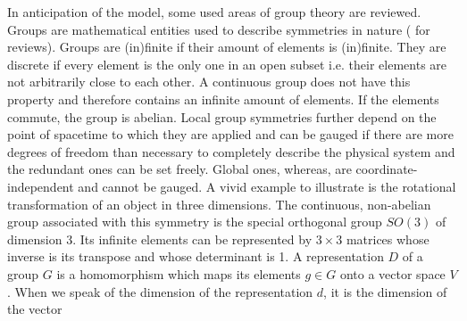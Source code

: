In anticipation of the model, some used areas of group theory are reviewed. Groups are mathematical entities used to describe symmetries in nature
(\cite{pierre}\cite{georgi} for reviews). Groups are (in)finite if their amount of elements is (in)finite. They are discrete if every element
is the only one in an open subset
i.e. their elements are not arbitrarily close to each other. A continuous group does not have this property and therefore
contains an infinite amount of elements. If the elements commute, the group is abelian. 
Local group symmetries further depend on the point of spacetime to which they are applied and can be gauged if there are more degrees of freedom
than necessary to completely describe the physical system and the redundant ones can be set freely. Global ones,
whereas, are coordinate-independent and cannot be gauged. 
A vivid example to illustrate is the rotational transformation
of an object in three dimensions. The continuous, non-abelian group associated with this symmetry is the special orthogonal group 
$SO(3)$ of dimension 3. Its infinite elements can be represented by $3\times3$ matrices whose inverse is its 
transpose and whose determinant is 1.
% 
% 
% 
\noindent A representation $D$ of a group $G$ is a homomorphism which maps its elements $g\in G$ onto a vector space $V$. 
When we speak of the dimension of the representation $d$, it is the dimension of the vector 
